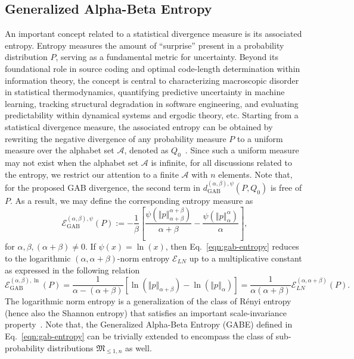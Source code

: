 \documentclass[11pt]{article}
\theoremstyle{plain}
\theoremstyle{remark}
\newcommand{\Acal}{\mathcal{A}}
\newcommand{\Mfrak}{\mathfrak{M}}
\newcommand{\dGAB}{d_{\mathrm{GAB}}}
\newcommand{\eGAB}{\mathcal{E}_{\mathrm{GAB}}}
\newcommand{\norm}[1]{\left\Vert #1 \right\Vert}
\newcommand{\todo}[1]{\textcolor{red}{#1}}
\begin{document}
\subsection{Generalized Alpha-Beta Entropy}\label{sec:gab-entropy}

An important concept related to a statistical divergence measure is its associated entropy. Entropy measures the amount of ``surprise'' present in a probability distribution $P$, serving as a fundamental metric for uncertainty. Beyond its foundational role in source coding and optimal code-length determination within information theory, the concept is central to characterizing macroscopic disorder in statistical thermodynamics, quantifying predictive uncertainty in machine learning, tracking structural degradation in software engineering, and evaluating predictability within dynamical systems and ergodic theory, etc. Starting from a statistical divergence measure, the associated entropy can be obtained by rewriting the negative divergence of any probability measure $P$ to a uniform measure over the alphabet set $\mathcal{A}$, denoted as $Q_0$~\citep{cichocki2010families}. Since such a uniform measure may not exist when the alphabet set $\Acal$ is infinite, for all discussions related to the entropy, we restrict our attention to a finite $\Acal$ with $n$ elements. Note that, for the proposed GAB divergence, the second term in $\dGAB^{(\alpha,\beta),\psi}(P, Q_0)$ is free of $P$. As a result, we may define the corresponding entropy measure as
\begin{equation}
    \eGAB^{(\alpha,\beta), \psi}(P) := -\dfrac{1}{\beta} \left[ \frac{\psi\left( \norm{p}_{\alpha+\beta}^{\alpha+\beta} \right)}{\alpha+\beta} - \frac{\psi\left( \norm{p}_{\alpha}^{\alpha} \right)}{\alpha} \right],
    \label{eqn:gab-entropy}
\end{equation}
\noindent for $\alpha, \beta, (\alpha+\beta) \neq 0$. If $\psi(x) = \ln(x)$, then Eq.~\eqref{eqn:gab-entropy} reduces to the logarithmic $(\alpha,\alpha+\beta)$-norm entropy $\mathcal{E}_{LN}$ up to a multiplicative constant as expressed in the following relation
\begin{equation*}
    \eGAB^{(\alpha,\beta), \ln}(P)
    = \dfrac{1}{\alpha - (\alpha+\beta)}\left[ \ln\left( \norm{p}_{\alpha+\beta} \right) - \ln\left( \norm{p}_{\alpha} \right) \right]
    = \dfrac{1}{\alpha(\alpha+\beta)}\mathcal{E}_{LN}^{(\alpha,\alpha+\beta)}(P).
\end{equation*}
\noindent The logarithmic norm entropy is a generalization of the class of R\'{e}nyi entropy (hence also the Shannon entropy) that satisfies an important scale-invariance property~\citep{ghosh2021scale}. Note that, the Generalized Alpha-Beta Entropy (GABE) defined in Eq.~\eqref{eqn:gab-entropy} can be trivially extended to encompass the class of sub-probability distributions $\Mfrak_{\leq 1, n}$ as well.
\end{document}

